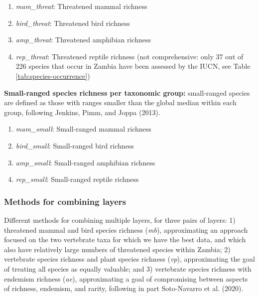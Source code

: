 \documentclass[
]{article}
\providecommand{\tightlist}{%
  \setlength{\itemsep}{0pt}\setlength{\parskip}{0pt}}
\begin{document}
\begin{enumerate}
\def\labelenumi{(\arabic{enumi})}
\setcounter{enumi}{16}
\tightlist
\item
  \emph{mam\_threat}: Threatened mammal richness
\item
  \emph{bird\_threat}: Threatened bird richness
\item
  \emph{amp\_threat}: Threatened amphibian richness
\item
  \emph{rep\_threat}: Threatened reptile richness (not comprehensive: only 37 out of 226 species that occur in Zambia have been assessed by the IUCN, see Table \ref{tab:species-occurrence})
\end{enumerate}

\textbf{Small-ranged species richness per taxonomic group:} small-ranged species are defined as those with ranges smaller than the global median within each group, following Jenkins, Pimm, and Joppa (2013).

\begin{enumerate}
\def\labelenumi{(\arabic{enumi})}
\setcounter{enumi}{20}
\tightlist
\item
  \emph{mam\_small}: Small-ranged mammal richness
\item
  \emph{bird\_small}: Small-ranged bird richness
\item
  \emph{amp\_small}: Small-ranged amphibian richness
\item
  \emph{rep\_small}: Small-ranged reptile richness
\end{enumerate}

\hypertarget{methods-for-combining-layers}{%
\subsubsection{Methods for combining layers}\label{methods-for-combining-layers}}

Different methods for combining multiple layers, for three pairs of layers: 1) threatened mammal and bird species richness (\emph{mb}), approximating an approach focused on the two vertebrate taxa for which we have the best data, and which also have relatively large numbers of threatened species within Zambia; 2) vertebrate species richness and plant species richness (\emph{vp}), approximating the goal of treating all species as equally valuable; and 3) vertebrate species richness with endemism richness (\emph{ae}), approximating a goal of compromising between aspects of richness, endemism, and rarity, following in part Soto-Navarro et al. (2020).
\end{document}
